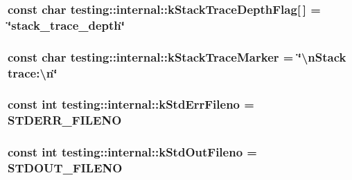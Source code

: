 \subsubsection[{\texorpdfstring{k\+Stack\+Trace\+Depth\+Flag}{kStackTraceDepthFlag}}]{\setlength{\rightskip}{0pt plus 5cm}const char testing\+::internal\+::k\+Stack\+Trace\+Depth\+Flag\mbox{[}$\,$\mbox{]} = \char`\"{}stack\+\_\+trace\+\_\+depth\char`\"{}}\hypertarget{namespacetesting_1_1internal_ad6f90e66d431ca3a9084408878c2cc77}{}\label{namespacetesting_1_1internal_ad6f90e66d431ca3a9084408878c2cc77}
\subsubsection[{\texorpdfstring{k\+Stack\+Trace\+Marker}{kStackTraceMarker}}]{\setlength{\rightskip}{0pt plus 5cm}const char testing\+::internal\+::k\+Stack\+Trace\+Marker = \char`\"{}\textbackslash{}n\+Stack trace\+:\textbackslash{}n\char`\"{}}\hypertarget{namespacetesting_1_1internal_abb38528ca6a45df265b19f5ccb3d16d9}{}\label{namespacetesting_1_1internal_abb38528ca6a45df265b19f5ccb3d16d9}
\subsubsection[{\texorpdfstring{k\+Std\+Err\+Fileno}{kStdErrFileno}}]{\setlength{\rightskip}{0pt plus 5cm}const int testing\+::internal\+::k\+Std\+Err\+Fileno = S\+T\+D\+E\+R\+R\+\_\+\+F\+I\+L\+E\+NO}\hypertarget{namespacetesting_1_1internal_a747eccfdbdee3ff8af3bedc476a57c85}{}\label{namespacetesting_1_1internal_a747eccfdbdee3ff8af3bedc476a57c85}
\subsubsection[{\texorpdfstring{k\+Std\+Out\+Fileno}{kStdOutFileno}}]{\setlength{\rightskip}{0pt plus 5cm}const int testing\+::internal\+::k\+Std\+Out\+Fileno = S\+T\+D\+O\+U\+T\+\_\+\+F\+I\+L\+E\+NO}\hypertarget{namespacetesting_1_1internal_a24f0a3d50cac54a9132f4828ec9b96d9}{}\label{namespacetesting_1_1internal_a24f0a3d50cac54a9132f4828ec9b96d9}
